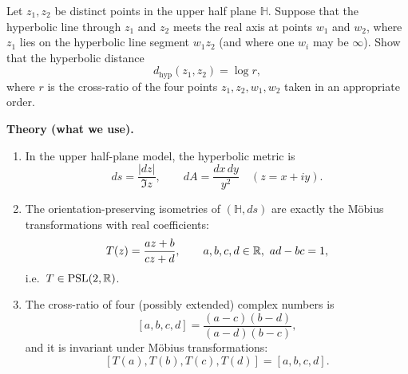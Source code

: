 \begin{problem}
\label{prob:cp-vii-0083}
Let $z_1,z_2$ be distinct points in the upper half plane $\mathbb{H}$.
	Suppose that the hyperbolic line through $z_1$ and $z_2$ meets the real axis
	at points $w_1$ and $w_2$, where $z_1$ lies on the hyperbolic line segment
	$w_1 z_2$ (and where one $w_i$ may be $\infty$).
	Show that the hyperbolic distance
	\[
	d_{\mathrm{hyp}}(z_1,z_2)=\log r,
	\]
	where $r$ is the cross-ratio of the four points $z_1,z_2,w_1,w_2$ taken in an
	appropriate order.
	
	\par\medskip\noindent\textbf{Theory (what we use).}\par\smallskip

	\begin{enumerate}
		\item In the upper half-plane model, the hyperbolic metric is
		\[
		ds=\frac{|dz|}{\Im z},
		\qquad
		dA=\frac{dx\,dy}{y^2}\quad (z=x+iy).
		\]
		\item The orientation-preserving isometries of $(\mathbb{H},ds)$ are exactly the M\"{o}bius
		transformations with real coefficients:
		\[
		T(z)=\frac{az+b}{cz+d},\qquad a,b,c,d\in\R,\ ad-bc=1,
		\]
		i.e.\ $T\in \operatorname{PSL}(2,\mathbb{R})$.
		\item The cross-ratio of four (possibly extended) complex numbers is
		\[
		[a,b,c,d]=\frac{(a-c)(b-d)}{(a-d)(b-c)},
		\]
		and it is invariant under M\"{o}bius transformations:
		\[
		[T(a),T(b),T(c),T(d)]=[a,b,c,d].
		\]
	\end{enumerate}
\end{problem}

